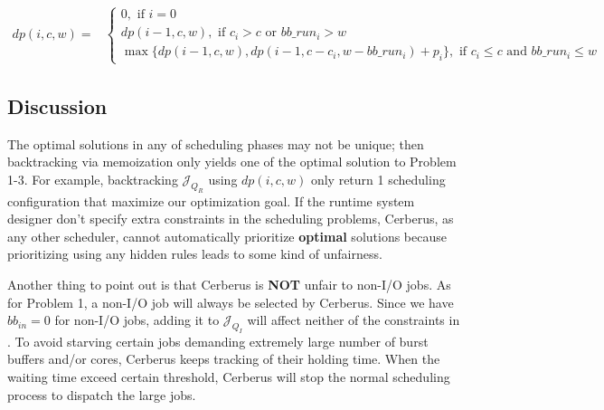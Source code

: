 \begin{strip}
        \begin{align}
                dp(i, c, w) = &
                \left\{
                        \begin{array}{l}
                                0, \text{ if $i=0$ } \\ [0.6em]
                                dp(i-1, c, w), \text{ if $c_i > c$ or $bb\_run_i > w$} \\ [0.6em]
                                \max \{ dp(i-1, c, w), dp(i-1, c - c_i, w - bb\_run_i) + p_i \}, \text{ if $c_i \leq c$ and $bb\_run_i \leq w$}
                        \end{array} 
                \right.
                \label{Equ:MaxProductRecursion}
        \end{align}
\end{strip}

\subsection{Discussion}
The optimal solutions in any of scheduling phases may not be unique;
then backtracking via memoization only yields one of the optimal solution to Problem 1-3.
For example, backtracking $\mathcal{J}_{Q_R}$ using $dp(i,c,w)$ only return 1 scheduling
configuration that maximize our optimization goal.
If the runtime system designer don't specify extra constraints in the scheduling problems,
Cerberus, as any other scheduler, cannot automatically prioritize \textbf{optimal} solutions
because prioritizing using any hidden rules leads to some kind of unfairness.

Another thing to point out is that Cerberus is \textbf{NOT} unfair to non-I/O jobs.
As for Problem 1, a non-I/O job will always be selected by Cerberus.
Since we have $bb_{in} = 0$ for non-I/O jobs, adding it to $\mathcal{J}_{Q_I}$ will affect
neither of the constraints in .
To avoid starving certain jobs demanding extremely large number of burst buffers and/or cores,
Cerberus keeps tracking of their holding time.
When the waiting time exceed certain threshold, Cerberus will stop the normal scheduling
process to dispatch the large jobs.



